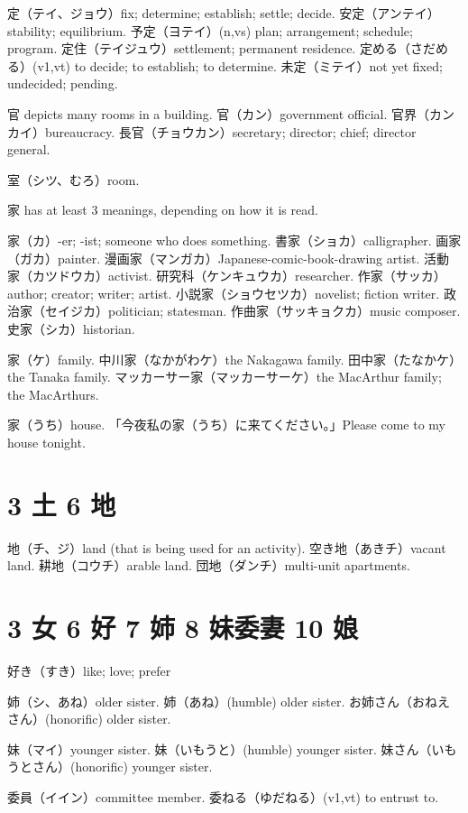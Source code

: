 定（テイ、ジョウ）fix; determine; establish; settle; decide.
安定（アンテイ）stability; equilibrium.
予定（ヨテイ）(n,vs) plan; arrangement; schedule; program.
定住（テイジュウ）settlement; permanent residence.
定める（さだめる）(v1,vt) to decide; to establish; to determine.
未定（ミテイ）not yet fixed; undecided; pending.

官 depicts many rooms in a building.
官（カン）government official.
官界（カンカイ）bureaucracy.
長官（チョウカン）secretary; director; chief; director general.

室（シツ、むろ）room.

家 has at least 3 meanings, depending on how it is read.

家（カ）-er; -ist; someone who does something.
書家（ショカ）calligrapher.
画家（ガカ）painter.
漫画家（マンガカ）Japanese-comic-book-drawing artist.
活動家（カツドウカ）activist.
研究科（ケンキュウカ）researcher.
作家（サッカ）author; creator; writer; artist.
小説家（ショウセツカ）novelist; fiction writer.
政治家（セイジカ）politician; statesman.
作曲家（サッキョクカ）music composer.
史家（シカ）historian.

家（ケ）family.
中川家（なかがわケ）the Nakagawa family.
田中家（たなかケ）the Tanaka family.
マッカーサー家（マッカーサーケ）the MacArthur family; the MacArthurs.

家（うち）house.
「今夜私の家（うち）に来てください。」Please come to my house tonight.

\section{3 土 6 地}

地（チ、ジ）land (that is being used for an activity).
空き地（あきチ）vacant land.
耕地（コウチ）arable land.
団地（ダンチ）multi-unit apartments.

\section{3 女 6 好 7 姉 8 妹委妻 10 娘}

好き（すき）like; love; prefer

姉（シ、あね）older sister.
姉（あね）(humble) older sister.
お姉さん（おねえさん）(honorific) older sister.

妹（マイ）younger sister.
妹（いもうと）(humble) younger sister.
妹さん（いもうとさん）(honorific) younger sister.

委員（イイン）committee member.
委ねる（ゆだねる）(v1,vt) to entrust to.

